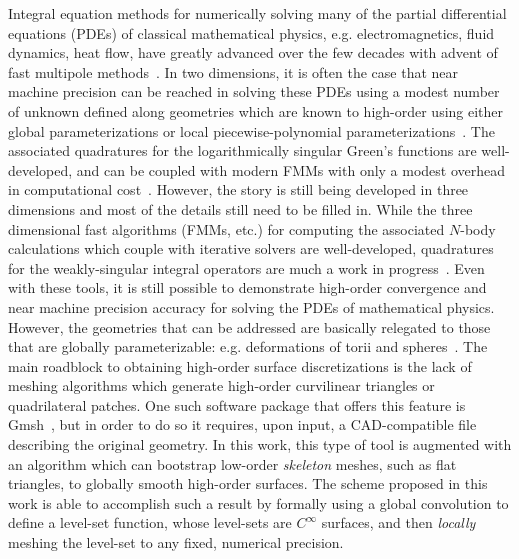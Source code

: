 \documentclass[11pt]{article}
\numberwithin{equation}{section}
\begin{document}
Integral equation methods for numerically solving many of the partial
differential equations (PDEs) of classical mathematical physics,
e.g. electromagnetics, fluid dynamics, heat flow, have greatly
advanced over the few decades with advent of fast multipole
methods~\cite{song1997multilevel,coifman1993fast,tornberg-2008}. In
two dimensions, it is often the case that near machine precision can
be reached in solving these PDEs using a modest number of unknown
defined along geometries which are known to high-order using either
global parameterizations or local piecewise-polynomial
parameterizations~\cite{helsing2015determination,helsing}. The
associated quadratures for the logarithmically singular Green's
functions are well-developed, and can be coupled with modern FMMs with
only a modest overhead in computational
cost~\cite{hao_2014,rachh_2016}.  However, the story is still being
developed in three dimensions and most of the details still need to be
filled in.  While the three dimensional fast algorithms (FMMs, etc.)
for computing the associated $N$-body calculations which couple with
iterative solvers are well-developed, quadratures for the
weakly-singular integral operators are much a work in
progress~\cite{wala2018qbx,bremer-2015,bruno2001fast}.  Even with
these tools, it is still possible to demonstrate high-order
convergence and near machine precision accuracy for solving the PDEs
of mathematical physics. However, the geometries that can be addressed
are basically relegated to those that are globally parameterizable:
e.g. deformations of torii and
spheres~\cite{bremer-2015,oneil2018surface}.  The main roadblock to
obtaining high-order surface discretizations is the lack of meshing
algorithms which generate high-order curvilinear triangles or
quadrilateral patches.  One such software package that offers this
feature is Gmsh~\cite{gmsh}, but in order to do so it requires, upon
input, a CAD-compatible file describing the original geometry.  In
this work, this type of tool is augmented with an algorithm which can
bootstrap low-order \emph{skeleton} meshes, such as flat triangles, to
globally smooth high-order surfaces. The scheme proposed in this work
is able to accomplish such a result by formally using a global
convolution to define a level-set function, whose level-sets are
$C^\infty$ surfaces, and then \emph{locally} meshing the level-set to
any fixed, numerical precision.
\end{document}
